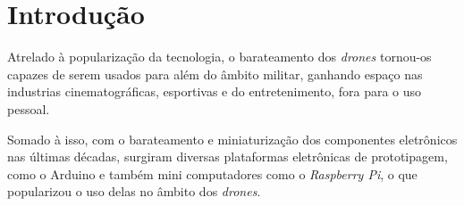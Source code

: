 \documentclass[12pt,a4paper,oneside]{book}
\begin{document}
%
\listoffigures
%
%
\thispagestyle{myheadings}
%


%
\listoftables
%
%
\thispagestyle{myheadings}
%


%
\tableofcontents
%
\thispagestyle{myheadings}

\clearpage



%




\chapter{Introdução}
%
\thispagestyle{empty} 
%
%

Atrelado à popularização da tecnologia, o barateamento dos \textit{drones} tornou-os capazes de serem usados para além do âmbito militar, ganhando espaço nas industrias cinematográficas, esportivas e do entretenimento, fora para o uso pessoal.

Somado à isso, com o barateamento e miniaturização dos componentes eletrônicos nas últimas décadas, surgiram diversas plataformas eletrônicas de prototipagem, como o Arduino e também mini computadores como o \textit{Raspberry Pi}, o que popularizou o uso delas no âmbito dos \textit{drones}. 
\end{document}
